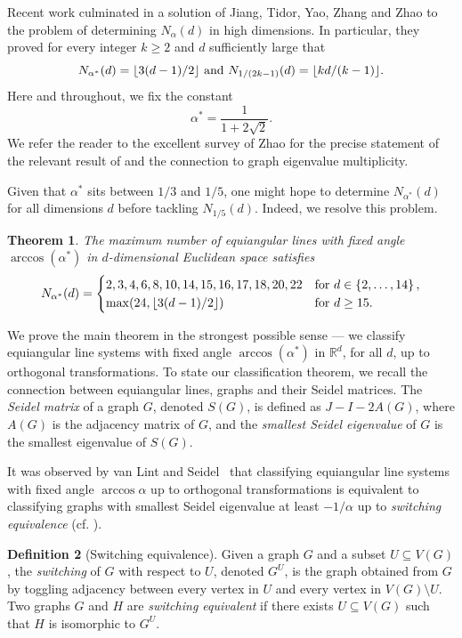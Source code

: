 \documentclass[11pt]{article}
\newtheorem{theorem}{Theorem}[section]
\theoremstyle{definition}
\newtheorem{definition}[theorem]{Definition}
\theoremstyle{remark}
\DeclarePairedDelimiter\floor{\lfloor}{\rfloor}
\newcommand{\sset}[1]{\left\{{#1}\right\}}
\newcommand{\R}{\mathbb{R}}
\newcommand{\rtwo}{\alpha^*}
\newcommand{\artwo}{\arccos(\rtwo)}
\begin{document}
Recent work \cite{B16,BDKS18,JP20} culminated in a solution \cite{JTYZZ21} of Jiang, Tidor, Yao, Zhang and Zhao to the problem of determining $N_\alpha(d)$ in high dimensions. In particular, they proved for every integer $k \ge 2$ and 
$d$ sufficiently large that
\[
    N_{\rtwo}(d) = \floor{3(d-1)/2} \text{ and }N_{1/(2k-1)}(d) = \floor{kd/(k-1)}.
\]
Here and throughout, we fix the constant
\[
    \rtwo = \frac{1}{1 + 2\sqrt2}.
\]
We refer the reader to the excellent survey \cite{Z24} of Zhao for the precise statement of the relevant result of \cite{JTYZZ21} and the connection to graph eigenvalue multiplicity.

Given that $\rtwo$ sits between $1/3$ and $1/5$, one might hope to determine $N_{\rtwo}(d)$ for all dimensions $d$ before tackling $N_{1/5}(d)$. Indeed, we resolve this problem.

\begin{theorem} \label{thm:main}
    The maximum number of equiangular lines with fixed angle $\artwo$ in $d$-dimensional Euclidean space satisfies
    \[
        N_{\rtwo}(d) = \begin{cases}
            2,3,4,6,8,10,14,15,16,17,18,20,22 & \text{for }d \in \sset{2,\dots, 14}, \\
            \max(24, \floor{3(d-1)/2}) & \text{for }d \ge 15.
        \end{cases}
    \]
\end{theorem}

We prove the main theorem in the strongest possible sense --- we classify equiangular line systems with fixed angle $\artwo$ in $\R^d$, for all $d$, up to orthogonal transformations. To state our classification theorem, we recall the connection between equiangular lines, graphs and their Seidel matrices. The \emph{Seidel matrix} of a graph $G$, denoted $S(G)$, is defined as $J - I - 2A(G)$, where $A(G)$ is the adjacency matrix of $G$, and the \emph{smallest Seidel eigenvalue} of $G$ is the smallest eigenvalue of $S(G)$.

It was observed by van Lint and Seidel~\cite{vLS66} that classifying equiangular line systems with fixed angle $\arccos\alpha$ up to orthogonal transformations is equivalent to classifying graphs with smallest Seidel eigenvalue at least $-1/\alpha$ up to \emph{switching equivalence} (cf. \cite[Chapter~11]{GR01}).

\begin{definition}[Switching equivalence]
    Given a graph $G$ and a subset $U \subseteq V(G)$, the \emph{switching} of $G$ with respect to $U$, denoted $G^U$, is the graph obtained from $G$ by toggling adjacency between every vertex in $U$ and every vertex in $V(G) \setminus U$. Two graphs $G$ and $H$ are \emph{switching equivalent} if there exists $U \subseteq V(G)$ such that $H$ is isomorphic to $G^U$.
\end{definition}
\end{document}
